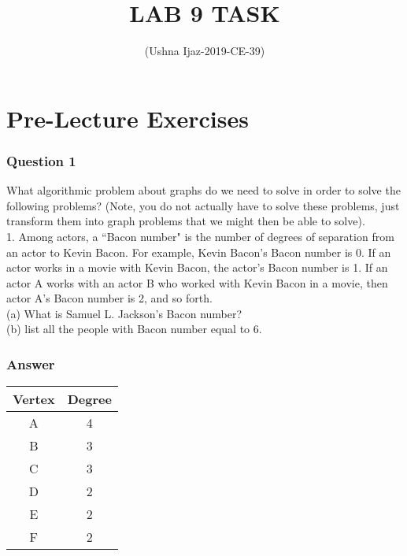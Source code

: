 \documentclass[10pt]{article}
\begin{document}
\title{\textbf{LAB 9 TASK}}

\author{(Ushna Ijaz-2019-CE-39)}
\maketitle

\part*{Pre-Lecture Exercises }

\section*{Question 1}
What algorithmic problem about graphs do we need to solve in order to solve the following
problems? (Note, you do not actually have to solve these problems, just transform them into graph
problems that we might then be able to solve).\\
1. Among actors, a “Bacon number" is the number of degrees of separation from an actor to
Kevin Bacon. For example, Kevin Bacon’s Bacon number is 0. If an actor works in a movie
with Kevin Bacon, the actor’s Bacon number is 1. If an actor A works with an actor B who
worked with Kevin Bacon in a movie, then actor A’s Bacon number is 2, and so forth.\\
(a) What is Samuel L. Jackson’s Bacon number?\\
(b) list all the people with Bacon number equal to 6. 


\section*{Answer}


\begin{center}
 \begin{tabular}{||c c ||} 
 \hline
 Vertex & Degree  \\ [0.5ex]  
 \hline
 A & 4 \\
 \hline
 B & 3 \\
 \hline
 C & 3  \\
 \hline
 D & 2 \\ 
 \hline
 E & 2 \\
 \hline
 F & 2 \\[1ex] 
 \hline
\end{tabular}
\end{center}
\end{document}
